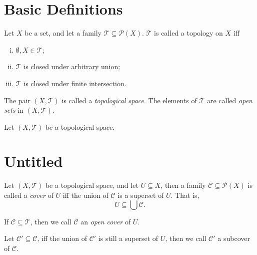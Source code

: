 

\section{Basic Definitions}



\begin{definition}
	\label{def: topology and topological space}
	Let $X$ be a set, and let a family $\mathcal T \subseteq \mathcal P(X)$. $\mathcal T$ is called a topology on $X$ iff
	\begin{enumerate}[(i)]
		\item $\emptyset, X \in \mathcal T$;
		\item $\mathcal T$ is closed under arbitrary union;
		\item $\mathcal T$ is closed under finite intersection.
	\end{enumerate}
	The pair $(X, \mathcal T)$ is called a \textit{topological space}. The elements of $\mathcal T$ are called \textit{open sets} in $(X, \mathcal T)$.
\end{definition}


\begin{definition}
	\label{def: metrizable topology}
	Let $(X, \mathcal T)$ be a topological space.
\end{definition}


\section{Untitled}


\begin{definition}
	[cover]
	\label{def: cover}
	Let $(X, \mathcal T)$ be a topological space, and let $U \subseteq X$, then a family $\mathcal C \subseteq \mathcal P(X)$ is called a \textit{cover} of $U$ iff the union of $\mathcal C$ is a superset of $U$. That is,
	$$
	U \subseteq \bigcup \mathcal C.
	$$
	
	If $\mathcal C \subseteq \mathcal T$, then we call $\mathcal C$ an \textit{open cover} of $U$.
	
	Let $\mathcal C' \subseteq \mathcal C$, iff the union of $\mathcal C'$ is still a superset of $U$, then we call $\mathcal C'$ a subcover of $\mathcal C$.
\end{definition}


